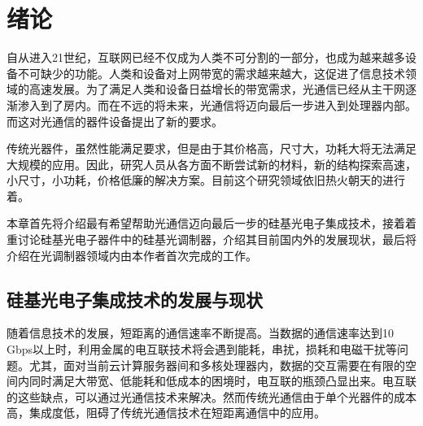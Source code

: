 \chapter{绪论}
自从进入21世纪，互联网已经不仅成为人类不可分割的一部分，也成为越来越多设备不可缺少的功能。人类和设备对上网带宽的需求越来越大，这促进了信息技术领域的高速发展。为了满足人类和设备日益增长的带宽需求，光通信已经从主干网逐渐渗入到了房内。而在不远的将未来，光通信将迈向最后一步进入到处理器内部。而这对光通信的器件设备提出了新的要求。


传统光器件，虽然性能满足要求，但是由于其价格高，尺寸大，功耗大将无法满足大规模的应用。因此，研究人员从各方面不断尝试新的材料，新的结构探索高速，小尺寸，小功耗，价格低廉的解决方案。目前这个研究领域依旧热火朝天的进行着。


本章首先将介绍最有希望帮助光通信迈向最后一步的硅基光电子集成技术，接着着重讨论硅基光电子器件中的硅基光调制器，介绍其目前国内外的发展现状，最后将介绍在光调制器领域内由本作者首次完成的工作。


\section{硅基光电子集成技术的发展与现状}
随着信息技术的发展，短距离的通信速率不断提高。当数据的通信速率达到10 Gbps以上时，利用金属的电互联技术将会遇到能耗，串扰，损耗和电磁干扰等问题。尤其，面对当前云计算服务器间和多核处理器内，数据的交互需要在有限的空间内同时满足大带宽、低能耗和低成本的困境时，电互联的瓶颈凸显出来。电互联的这些缺点，可以通过光通信技术来解决。然而传统光通信由于单个光器件的成本高，集成度低，阻碍了传统光通信技术在短距离通信中的应用。

